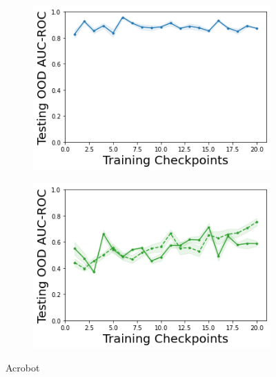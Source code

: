 \begin{figure}
\begin{subfigure}{.24\textwidth}
        \includegraphics[width=\textwidth]{sections/011_icml2022/resources/DKL-AcrobotOOD-v0-AUC-ROC-epistemic_-testing-strategy.png}
    \end{subfigure}
    \begin{subfigure}{.24\textwidth}
        \includegraphics[width=\textwidth]{sections/011_icml2022/resources/PostNet-AcrobotOOD-v0-AUC-ROC-epistemic_-testing-strategy.png}
    \end{subfigure}
    \vspace{-3mm}
    \caption*{Acrobot}
    \vspace{2mm}


\end{figure}
